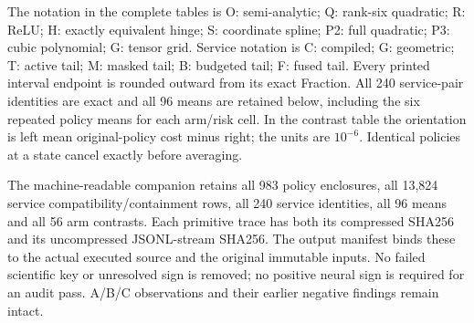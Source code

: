 The notation in the complete tables is O: semi-analytic; Q: rank-six quadratic;
R: ReLU; H: exactly equivalent hinge; S: coordinate spline; P2: full quadratic;
P3: cubic polynomial; G: tensor grid. Service notation is C: compiled;
G: geometric; T: active tail; M: masked tail; B: budgeted tail; F: fused tail.
Every printed interval endpoint is rounded outward from its exact Fraction.
All 240 service-pair identities are exact and all 96 means are retained below,
including the six repeated policy means for each arm/risk cell. In the contrast
table the orientation is left mean original-policy cost minus right; the units
are $10^{-6}$. Identical policies at a state cancel exactly before averaging.




The machine-readable companion retains all 983 policy enclosures, all 13,824
service compatibility/containment rows, all 240 service identities, all 96 means
and all 56 arm contrasts. Each primitive trace has both its compressed SHA256
and its uncompressed JSONL-stream SHA256. The output manifest binds these to the
actual executed source and the original immutable inputs. No failed scientific
key or unresolved sign is removed; no positive neural sign is required for an
audit pass. A/B/C observations and their earlier negative findings remain intact.
